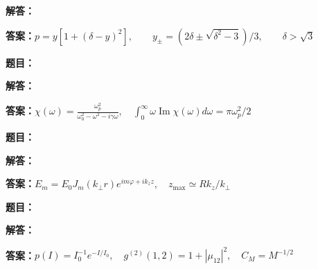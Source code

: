 \documentclass[lang=cn,color=blue,11pt]{elegantbook}
\begin{document}
\par\noindent\textbf{解答：}
\par\noindent\textbf{答案：}\(\displaystyle p=y[1+(\delta-y)^2],\qquad y_\pm=(2\delta\pm\sqrt{\delta^2-3})/3,\qquad\delta>\sqrt3\)\par
\par\smallskip\noindent\hrulefill\par\medskip
{}\par
\noindent\textbf{题目：}
\par\noindent\textbf{解答：}
\par\noindent\textbf{答案：}\(\displaystyle \chi(\omega)=\frac{\omega_p^2}{\omega_0^2-\omega^2-i\gamma\omega},\quad\int_0^\infty\omega\operatorname{Im}\chi(\omega)d\omega=\pi\omega_p^2/2\)\par
\par\smallskip\noindent\hrulefill\par\medskip
{}\par
\noindent\textbf{题目：}
\par\noindent\textbf{解答：}
\par\noindent\textbf{答案：}\(\displaystyle E_m=E_0J_m(k_\perp r)e^{im\varphi+ik_zz},\quad z_{\max}\simeq Rk_z/k_\perp\)\par
\par\smallskip\noindent\hrulefill\par\medskip
{}\par
\noindent\textbf{题目：}
\par\noindent\textbf{解答：}
\par\noindent\textbf{答案：}\(\displaystyle p(I)=I_0^{-1}e^{-I/I_0},\quad g^{(2)}(1,2)=1+|\mu_{12}|^2,\quad C_M=M^{-1/2}\)\par
\par\smallskip\noindent\hrulefill\par\medskip
{}\par
\end{document}
